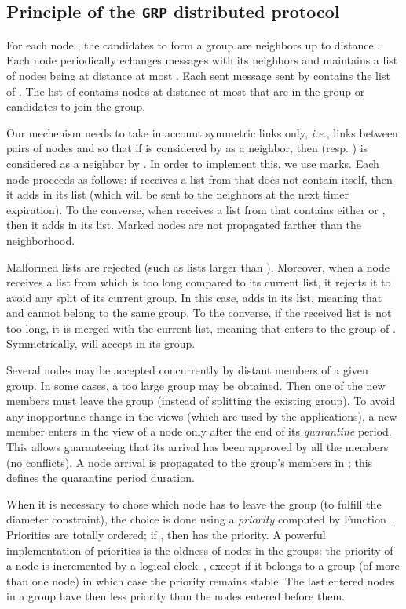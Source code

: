 \documentclass[11pt,english]{article}
\newcommand{\Latin}[1]{\textit{#1}}
\newcommand{\ie}{\Latin{i.e.},\xspace}
\begin{document}
\subsection{Principle of the \texttt{GRP} distributed protocol} 
For each node , the candidates to form a group are neighbors up to distance
.  Each node  periodically echanges messages with its neighbors and 
maintains a list of nodes being at distance at most . 
Each sent message sent by  contains the list of .  The list of  contains nodes at 
distance at most  that are in the group or candidates to join the group. 

Our mechenism needs to take in account symmetric links only, \ie links between pairs of nodes
 and  so that if  is considered by  as a neighbor, then  
(resp. ) is considered as a neighbor by . 
In order to implement this, we use marks.  Each node proceeds as follows:
if  receives a
list from  that does not contain itself, then it adds  in its
list (which will be sent to the neighbors at the next timer expiration). To the
converse, when  receives a list from  that contains either  or
, then it adds  in its list. Marked nodes are not propagated
farther than the neighborhood.

Malformed lists are rejected (such as lists larger than ).
Moreover, when a node  receives a list from  which is too long compared to
its current list, it rejects it to avoid any split of its current group. In this
case,  adds  in its list, meaning that  and 
cannot belong to the same group. To the converse, if the received list is not
too long, it is merged with the current list, meaning that  enters to the
group of . Symmetrically,  will accept  in its group.

Several nodes may be accepted concurrently by distant members of a given
group. In some cases, a too large group may be obtained. Then one of the new
members must leave the group (instead of splitting the existing group).  To
avoid any inopportune change in the views (which are used by the applications),
a new member enters in the view of a node only after the end of its
\emph{quarantine} period. This allows guaranteeing that its arrival has been
approved by all the members (no conflicts). A node arrival is propagated to the
group's members in ; this defines the quarantine period
duration.

When it is necessary to chose which node has to leave the group (to fulfill the
diameter constraint), the choice is done using a \emph{priority} computed by Function~. 
Priorities are
totally ordered; if , then  has the
priority. 
A powerful implementation of priorities is the oldness of nodes in the groups:
the priority of a node is incremented  by a logical clock~\cite{L78}, except if it belongs to a
group (of more than one node) in which case the priority remains stable. The
last entered nodes in a group have then less priority than the nodes entered
before them.
\end{document}
